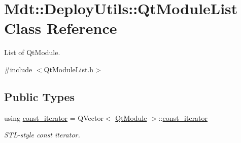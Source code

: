 \hypertarget{class_mdt_1_1_deploy_utils_1_1_qt_module_list}{}\section{Mdt\+:\+:Deploy\+Utils\+:\+:Qt\+Module\+List Class Reference}
\label{class_mdt_1_1_deploy_utils_1_1_qt_module_list}


List of Qt\+Module.  




{\ttfamily \#include $<$Qt\+Module\+List.\+h$>$}

\subsection*{Public Types}
\begin{DoxyCompactItemize}
\item 
using \hyperlink{class_mdt_1_1_deploy_utils_1_1_qt_module_list_ad6f5d3797918d10ffcce59cf37fcd86f}{const\+\_\+iterator} = Q\+Vector$<$ \hyperlink{namespace_mdt_1_1_deploy_utils_af64a196dd2a56ed4930253e7fb4ed591}{Qt\+Module} $>$\+::\hyperlink{class_mdt_1_1_deploy_utils_1_1_qt_module_list_ad6f5d3797918d10ffcce59cf37fcd86f}{const\+\_\+iterator}\hypertarget{class_mdt_1_1_deploy_utils_1_1_qt_module_list_ad6f5d3797918d10ffcce59cf37fcd86f}{}\label{class_mdt_1_1_deploy_utils_1_1_qt_module_list_ad6f5d3797918d10ffcce59cf37fcd86f}

\begin{DoxyCompactList}\small\item\em S\+T\+L-\/style const iterator. \end{DoxyCompactList}\end{DoxyCompactItemize}

